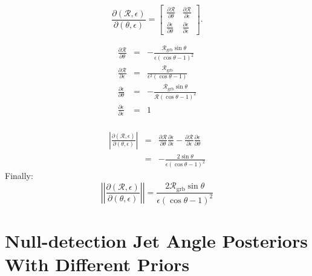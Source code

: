 \documentclass[twocolumn,nofootinbib]{revtex4-1}
\newcommand{\grbrate}{{{\mathcal R}_{\mathrm{grb}}}}
\newcommand{\cbcrate}{{{\mathcal R}}}
\begin{document}
\begin{equation}
\frac{\partial (\cbcrate,\epsilon)}{\partial(\theta,\epsilon)} =
\begin{bmatrix}
\frac{\partial \cbcrate}{\partial \theta} & \frac{\partial \cbcrate}{\partial \epsilon} \\
\frac{\partial \epsilon}{\partial \theta} & \frac{\partial \epsilon}{\partial \epsilon}
\end{bmatrix}.
\end{equation}

\endgroup

\begin{eqnarray}
\frac{\partial \cbcrate}{\partial \theta} & = &
-\frac{\grbrate\sin\theta}{\epsilon(\cos\theta - 1)^2}\\
\frac{\partial \cbcrate}{\partial \epsilon} & = &
\frac{\grbrate}{\epsilon^2(\cos\theta-1)}\\
\frac{\partial \epsilon}{\partial \theta} & = &
-\frac{\grbrate\sin\theta}{\cbcrate(\cos\theta-1)^2}\\
\frac{\partial \epsilon}{\partial \epsilon} & = & 1\\
\end{eqnarray}

\begin{eqnarray}
\left\lvert
\frac{\partial(\cbcrate,\epsilon)}{\partial(\theta,\epsilon)}
\right\rvert & = & \frac{\partial \cbcrate}{\partial \theta}
\frac{\partial \epsilon}{\partial \epsilon} - \frac{\partial \cbcrate}{\partial
\epsilon}\frac{\partial \epsilon}{\partial \theta} \\
& = & -\frac{2\sin\theta}{\epsilon(\cos\theta-1)^2}
\end{eqnarray}
%
Finally:
\begin{equation}
\left\lvert\left\lvert
\frac{\partial(\cbcrate,\epsilon)}{\partial(\theta,\epsilon)}
\right\rvert\right\rvert = \frac{2\grbrate\sin\theta}{\epsilon(\cos\theta-1)^2} 
\end{equation}

\section{Null-detection Jet Angle Posteriors With Different Priors}


\end{document}
